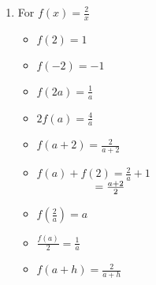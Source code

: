 \begin{enumerate}
\begin{multicols}{3}
\begin{itemize}
\vfill

\columnbreak


\item  $f(a + h) = \frac{a+h}{2}$

\end{itemize}
\end{multicols}

\pagebreak

\item For $f(x) = \frac{2}{x}$

\begin{multicols}{3}
\begin{itemize}

\item  $f(2) = 1$
\item  $f(-2) = -1$
\item  $f(2a) = \frac{1}{a}$

\end{itemize}
\end{multicols}

\begin{multicols}{3}
\begin{itemize}

\item  $2 f(a) = \frac{4}{a}$
\item $f(a+2) = \frac{2}{a+2}$

\vfill

\columnbreak


\item $f(a) + f(2) = \frac{2}{a}+1$ \\
      $\hphantom{f(a)+f(2)}=\frac{a+2}{2}$

\end{itemize}
\end{multicols}

\begin{multicols}{3}
\begin{itemize}

\item  $f \left( \frac{2}{a} \right) = a$

\vfill

\columnbreak

\item $\frac{f(a)}{2} =  \frac{1}{a}$

\vfill

\columnbreak


\item  $f(a + h) = \frac{2}{a+h}$

\end{itemize}
\end{multicols}

\setcounter{HW}{\value{enumi}}
\end{enumerate}

